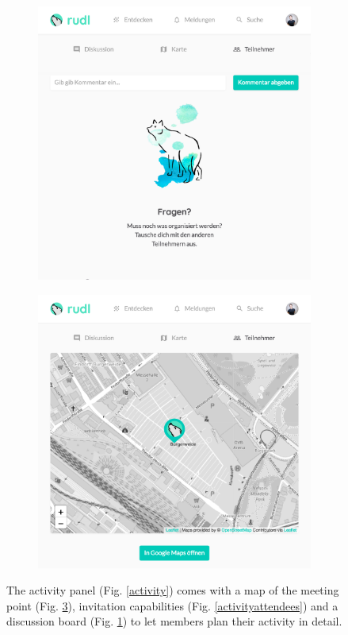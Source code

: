 \documentclass[12pt,numbers=noenddot,parskip,bibliography=totocnumbered,listof=totocnumbered,draft]{scrreprt}
\begin{document}
\begin{figure}
\begin{subfigure}[t]{0.45\textwidth}%
\centering
\includegraphics[width=\linewidth]{activitydiscussion.png}
\caption{}
\label{activitydiscussion}
\end{subfigure}%
\hfill
\begin{subfigure}[t]{0.45\textwidth}%
\centering
\includegraphics[width=\linewidth]{activitymap.png}
\caption{}
\label{activitymap}
\end{subfigure}%
\caption[Organization of activities]{The activity panel (Fig. \ref{activity}) comes with a map of the meeting point (Fig. \ref{activitymap}), invitation capabilities (Fig. \ref{activityattendees}) and a discussion board (Fig. \ref{activitydiscussion}) to let members plan their activity in detail.}
\end{figure}
\end{document}
